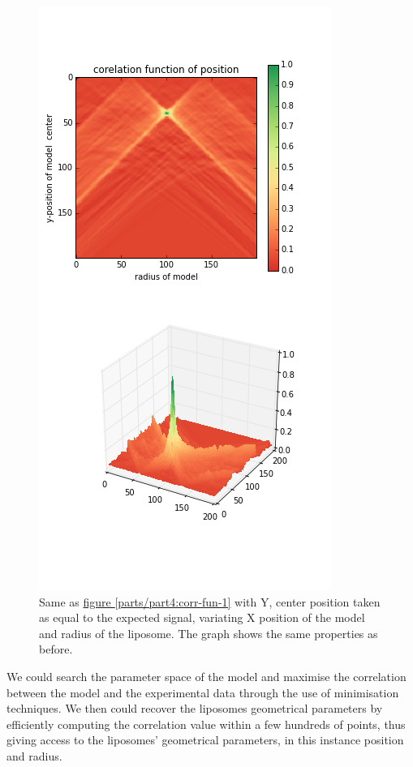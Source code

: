 \documentclass[A4paperpaper,11pt,english]{sphinxmanual}
\begin{document}
\begin{figure}[htbp]
\centering
\capstart

\includegraphics[width=0.600\linewidth]{c-R-_100-by-100-RC-40_0-noise-0_5-delta-4_0_.png}
\caption{Same as \hyperref[parts/part4:corr-fun-1]{figure  \ref*{parts/part4:corr-fun-1}}  with Y, center position taken
as equal to the expected signal, variating X position of the model and
radius of the liposome. The graph shows the same properties as before.}\label{parts/part4:corr-fun-2}\end{figure}

We could search the parameter space of the model and
maximise the correlation between the model and the experimental data through the use of minimisation techniques. We then
could recover the liposomes geometrical parameters by
efficiently computing the correlation value within a few hundreds of
points, thus giving access to the liposomes' geometrical parameters, in this instance position
and radius.
\end{document}
